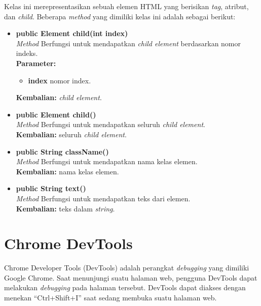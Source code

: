 Kelas ini merepresentasikan sebuah elemen HTML yang berisikan \textit{tag}, atribut, dan \textit{child}. Beberapa \textit{method} yang dimiliki kelas ini adalah sebagai berikut:
\begin{itemize}
	\item \textbf{public Element child(int index)} \\
		\textit{Method} Berfungsi untuk mendapatkan \textit{child element} berdasarkan nomor indeks. \\
		\textbf{Parameter:} 
		\begin{itemize}
			\item \textbf{index} nomor index.
		\end{itemize}
		\textbf{Kembalian:} \textit{child element}.	
		
		\item \textbf{public Element child()} \\
		\textit{Method} Berfungsi untuk mendapatkan seluruh \textit{child element}. \\
		\textbf{Kembalian:} seluruh \textit{child element}.	
		
		\item \textbf{public String className()} \\
		\textit{Method} Berfungsi untuk mendapatkan nama kelas elemen. \\
		\textbf{Kembalian:} nama kelas elemen.	
		
		\item \textbf{public String text()} \\
		\textit{Method} Berfungsi untuk mendapatkan teks dari elemen. \\
		\textbf{Kembalian:} teks dalam \textit{string}.	
\end{itemize}



\section{Chrome DevTools}
\label{sec:devtools}

Chrome Developer Tools (DevTools) \cite{devtools} adalah perangkat \textit{debugging} yang dimiliki Google Chrome. Saat menunjungi suatu halaman web, pengguna DevTools dapat melakukan \textit{debugging} pada halaman tersebut. DevTools dapat diakses dengan menekan "`Ctrl+Shift+I"' saat sedang membuka suatu halaman web.  

